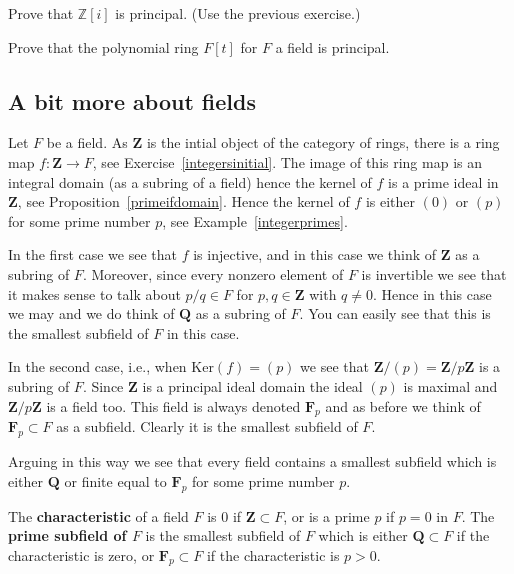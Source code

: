\begin{exercise} Prove that $\mathbb{Z}[i]$ is principal. (Use the previous
exercise.) \end{exercise}

\begin{exercise} \label{polyringisprincipal} Prove that the polynomial ring
$F[t]$ for $F$ a field is principal. \end{exercise}

\subsection{A bit more about fields} \label{more-fields}

\noindent Let $F$ be a field. As $\mathbf{Z}$ is the intial object of the
category of rings, there is a ring map $f : \mathbf{Z} \to F$, see
Exercise~\ref{integersinitial}. The image of this ring map is an integral
domain (as a subring of a field) hence the kernel of $f$ is a prime ideal in
$\mathbf{Z}$, see Proposition~\ref{primeifdomain}. Hence the kernel of $f$ is
either $(0)$ or $(p)$ for some prime number $p$, see
Example~\ref{integerprimes}.

In the first case we see that $f$ is injective, and in this case we think of
$\mathbf{Z}$ as a subring of $F$. Moreover, since every nonzero element of $F$
is invertible we see that it makes sense to talk about $p/q \in F$ for $p, q
\in \mathbf{Z}$ with $q \not = 0$. Hence in this case we may and we do think of
$\mathbf{Q}$ as a subring of $F$. You can easily see that this is the smallest
subfield of $F$ in this case.

In the second case, i.e., when $\text{Ker}(f) = (p)$ we see that
$\mathbf{Z}/(p) = \mathbf{Z}/p\mathbf{Z}$ is a subring of $F$. Since
$\mathbf{Z}$ is a principal ideal domain the ideal $(p)$ is maximal and
$\mathbf{Z}/p\mathbf{Z}$ is a field too. This field is always denoted
$\mathbf{F}_p$ and as before we think of $\mathbf{F}_p \subset F$ as a
subfield. Clearly it is the smallest subfield of $F$.

Arguing in this way we see that every field contains a smallest subfield which
is either $\mathbf{Q}$ or finite equal to $\mathbf{F}_p$ for some prime number
$p$.

\begin{definition} The \textbf{characteristic} of a field $F$ is $0$ if
$\mathbf{Z} \subset F$, or is a prime $p$ if $p = 0$ in $F$. The \textbf{prime
subfield of $F$} is the smallest subfield of $F$ which is either $\mathbf{Q}
\subset F$ if the characteristic is zero, or $\mathbf{F}_p \subset F$ if the
characteristic is $p > 0$. \end{definition}

